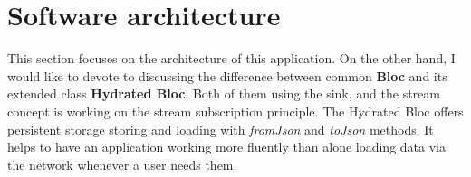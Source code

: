 \section{Software architecture}\label{sec:software-architecture}
This section focuses on the architecture of this application.
On the other hand, I would like to devote to discussing the difference between common \textbf{Bloc} and its extended class \textbf{Hydrated Bloc}.
Both of them using the sink, and the stream concept is working on the stream subscription principle.
The Hydrated Bloc offers persistent storage storing and loading with \textit{fromJson} and \textit{toJson} methods.
It helps to have an application working more fluently than alone loading data via the network whenever a user needs them.









